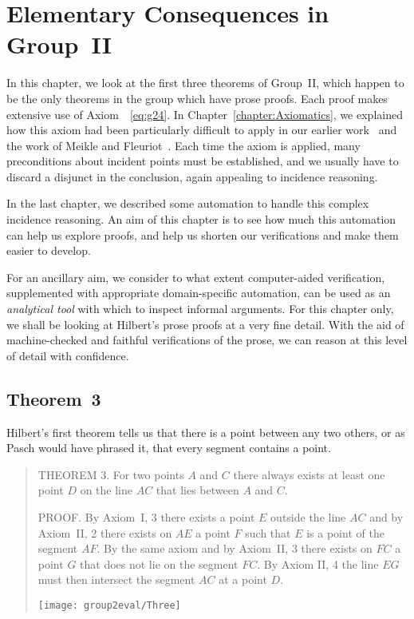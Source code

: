 \chapter{Elementary Consequences in Group~II}\label{chapter:Group2Eval}
In this chapter, we look at the first three theorems of Group~II, which happen to be the only theorems in the group which have prose proofs. Each proof makes extensive use of Axiom~~\ref{eq:g24}. In Chapter~\ref{chapter:Axiomatics}, we explained how this axiom had been particularly difficult to apply in our earlier work~\cite{ScottMScThesis} and the work of Meikle and Fleuriot~\cite{MeikleFleuriotFormalizingHilbert}. Each time the axiom is applied, many preconditions about incident points must be established, and we usually have to discard a disjunct in the conclusion, again appealing to incidence reasoning. 

In the last chapter, we described some automation to handle this complex incidence reasoning. An aim of this chapter is to see how much this automation can help us explore proofs, and help us shorten our verifications and make them easier to develop. 

For an ancillary aim, we consider to what extent computer-aided verification, supplemented with appropriate domain-specific automation, can be used as an \emph{analytical tool} with which to inspect informal arguments. For this chapter only, we shall be looking at Hilbert's prose proofs at a very fine detail. With the aid of machine-checked and faithful verifications of the prose, we can reason at this level of detail with confidence.

\section{Theorem~3}\label{sec:Theorem3}
Hilbert's first theorem tells us that there is a point between any two others, or as Pasch would have phrased it, that every segment contains a point.

\begin{quotation}
THEOREM 3. For two points $A$ and $C$ there always exists at least one point $D$ on the line $AC$ that lies between $A$ and $C$.

PROOF. By Axiom~I, 3 there exists a point $E$ outside the line $AC$ and by Axiom~II, 2 there exists on $AE$ a point $F$ such that $E$ is a point of the segment $AF$. By the same axiom and by Axiom~II, 3 there exists on $FC$ a point $G$ that does not lie on the segment $FC$. By Axiom II, 4 the line $EG$ must then intersect the segment $AC$ at a point $D$.

\centering\texttt{[image: group2eval/Three]}
\end{quotation}

